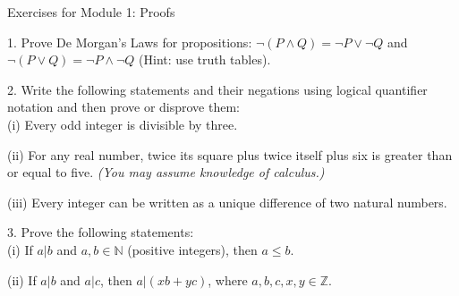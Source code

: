 \documentclass{article}
\theoremstyle{remark} %
\newcommand{\Z}{{\mathbb{Z}}}
\newcommand{\N}{{\mathbb{N}}}
\begin{document}
\begin{center}
\Large{Exercises for Module 1: Proofs}
\end{center}


1.  Prove De Morgan's Laws for propositions: $\neg (P \wedge Q) = \neg P \vee \neg Q$ and $\neg (P \vee Q) = \neg P \wedge \neg Q$ (Hint: use truth tables).

\vspace{11cm} %



2. Write the following statements and their negations using logical quantifier notation and then prove or disprove them: \\
(i) Every odd integer is divisible by three.

\vspace{9cm} %


(ii) For any real number, twice its square plus twice itself plus six is greater than or equal to five. \textit{(You may assume knowledge of calculus.)}

\vspace{7cm} %


(iii) Every integer can be written as a unique difference of two natural numbers.


\vspace{7cm} %



3. Prove the following statements: \\
(i) If $a | b$ and $a,b \in \N$ (positive integers), then $a \leq b$.

\vspace{11cm} %



(ii) If $a | b$ and $a | c$, then $a | (x b + y c)$, where $a,b,c,x,y \in \Z$.
\end{document}
